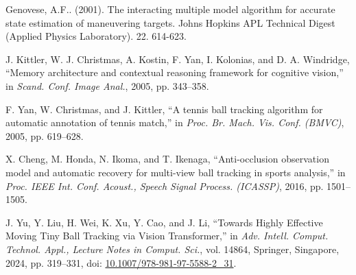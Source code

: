 \documentclass[conference]{IEEEtran}
\begin{document}
\begin{thebibliography}{99}
 Genovese, A.F.. (2001). The interacting multiple model algorithm for accurate state estimation of maneuvering targets. Johns Hopkins APL Technical Digest (Applied Physics Laboratory). 22. 614-623. 

 J. Kittler, W. J. Christmas, A. Kostin, F. Yan, I. Kolonias, and D. A. Windridge, ``Memory architecture and contextual reasoning framework for cognitive vision,'' in \textit{Scand. Conf. Image Anal.}, 2005, pp. 343--358.

 F. Yan, W. Christmas, and J. Kittler, ``A tennis ball tracking algorithm for automatic annotation of tennis match,'' in \textit{Proc. Br. Mach. Vis. Conf. (BMVC)}, 2005, pp. 619--628.

 X. Cheng, M. Honda, N. Ikoma, and T. Ikenaga, ``Anti-occlusion observation model and automatic recovery for multi-view ball tracking in sports analysis,'' in \textit{Proc. IEEE Int. Conf. Acoust., Speech Signal Process. (ICASSP)}, 2016, pp. 1501--1505.

 J. Yu, Y. Liu, H. Wei, K. Xu, Y. Cao, and J. Li, ``Towards Highly Effective Moving Tiny Ball Tracking via Vision Transformer,'' in \textit{Adv. Intell. Comput. Technol. Appl., Lecture Notes in Comput. Sci.}, vol. 14864, Springer, Singapore, 2024, pp. 319--331, doi: \url{10.1007/978-981-97-5588-2_31}.







\end{thebibliography}
\end{document}
